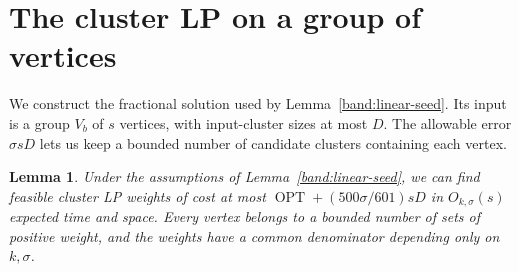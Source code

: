 \documentclass[11pt]{article}
\newtheorem{lemma}[theorem]{Lemma}
\newcommand{\OPT}{\operatorname{OPT}}
\begin{document}
\section{The cluster LP on a group of vertices}
\label{app:packing}

We construct the fractional solution used by
Lemma~\ref{band:linear-seed}. Its input is a group $V_b$ of $s$ vertices,
with input-cluster sizes at most $D$. The allowable error
$\sigma sD$ lets us keep a bounded number of candidate clusters containing
each vertex.

\begin{lemma}\label{lem:band-packing}
Under the assumptions of Lemma~\ref{band:linear-seed}, we can find
feasible cluster LP weights of cost at most
$\OPT+(500\sigma/601)sD$ in $O_{k,\sigma}(s)$ expected time
and space. Every vertex belongs to a bounded number of sets
of positive weight, and the weights have a common denominator
depending only on $k,\sigma$.
\end{lemma}
\end{document}
